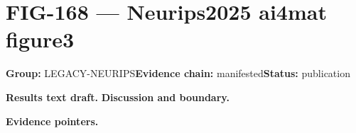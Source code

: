 \clearpage
\section{FIG-168 --- Neurips2025 ai4mat figure3}
\label{figpage:fig-168}
\textbf{Group:} LEGACY-NEURIPS\quad \textbf{Evidence chain:} manifested\quad \textbf{Status:} publication

\textbf{Results text draft.} 
\textbf{Discussion and boundary.} 


\textbf{Evidence pointers.}



\vfill
